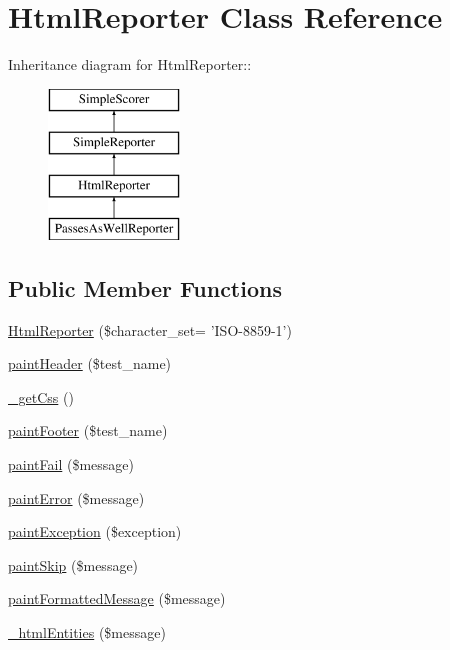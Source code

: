 \hypertarget{class_html_reporter}{
\section{HtmlReporter Class Reference}
\label{class_html_reporter}
}
Inheritance diagram for HtmlReporter::\begin{figure}[H]
\begin{center}
\leavevmode
\includegraphics[height=4cm]{class_html_reporter}
\end{center}
\end{figure}
\subsection*{Public Member Functions}
\begin{DoxyCompactItemize}
\item 
\hyperlink{class_html_reporter_ad515762c037bcb2b06d8dcf347ab1d40}{HtmlReporter} (\$character\_\-set= 'ISO-\/8859-\/1')
\item 
\hyperlink{class_html_reporter_a1d579bc4e86295e07da8f4e364092010}{paintHeader} (\$test\_\-name)
\item 
\hyperlink{class_html_reporter_ad07ccfd2972eaa99fb57055f430ec498}{\_\-getCss} ()
\item 
\hyperlink{class_html_reporter_a7397e35688d992bc2cfb17c973a980b4}{paintFooter} (\$test\_\-name)
\item 
\hyperlink{class_html_reporter_a5e19e29324ad91541a15586032744136}{paintFail} (\$message)
\item 
\hyperlink{class_html_reporter_af6c7e574ee27fa12c6c9299aa6939727}{paintError} (\$message)
\item 
\hyperlink{class_html_reporter_a13348c829f8853d8ad061b6b6112f5b8}{paintException} (\$exception)
\item 
\hyperlink{class_html_reporter_a6414bae0e65badca0d33030bd281f884}{paintSkip} (\$message)
\item 
\hyperlink{class_html_reporter_ac759b018db079ff7f6cc45ee43d3ef12}{paintFormattedMessage} (\$message)
\item 
\hyperlink{class_html_reporter_aac72f7e2d9ed9e802ebd7ef1eca8e3c7}{\_\-htmlEntities} (\$message)
\end{DoxyCompactItemize}
